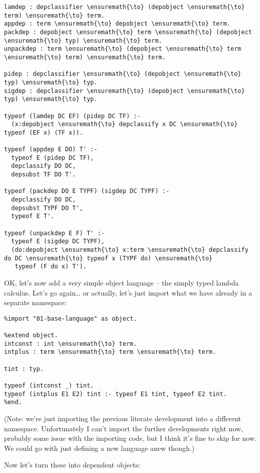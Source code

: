 \begin{verbatim}
lamdep : depclassifier \ensuremath{\to} (depobject \ensuremath{\to} term) \ensuremath{\to} term.
appdep : term \ensuremath{\to} depobject \ensuremath{\to} term.
packdep : depobject \ensuremath{\to} term \ensuremath{\to} (depobject \ensuremath{\to} typ) \ensuremath{\to} term.
unpackdep : term \ensuremath{\to} (depobject \ensuremath{\to} term \ensuremath{\to} term) \ensuremath{\to} term.

pidep : depclassifier \ensuremath{\to} (depobject \ensuremath{\to} typ) \ensuremath{\to} typ.
sigdep : depclassifier \ensuremath{\to} (depobject \ensuremath{\to} typ) \ensuremath{\to} typ.

typeof (lamdep DC EF) (pidep DC TF) :-
  (x:depobject \ensuremath{\to} depclassify x DC \ensuremath{\to} typeof (EF x) (TF x)).

typeof (appdep E DO) T' :-
  typeof E (pidep DC TF),
  depclassify DO DC,
  depsubst TF DO T'.

typeof (packdep DO E TYPF) (sigdep DC TYPF) :-
  depclassify DO DC,
  depsubst TYPF DO T',
  typeof E T'.

typeof (unpackdep E F) T' :-
  typeof E (sigdep DC TYPF),
  (do:depobject \ensuremath{\to} x:term \ensuremath{\to} depclassify do DC \ensuremath{\to} typeof x (TYPF do) \ensuremath{\to}
   typeof (F do x) T').
\end{verbatim}

OK, let's now add a very simple object language -- the simply typed
lambda calculus. Let's go again\ldots{} or actually, let's just import
what we have already in a separate namespace:

\begin{verbatim}
%import "01-base-language" as object.

%extend object.
intconst : int \ensuremath{\to} term.
intplus : term \ensuremath{\to} term \ensuremath{\to} term.

tint : typ.

typeof (intconst _) tint.
typeof (intplus E1 E2) tint :- typeof E1 tint, typeof E2 tint.
%end.
\end{verbatim}

(Note: we're just importing the previous literate development into a
different namespace. Unfortunately I can't import the further
developments right now, probably some issue with the importing code, but
I think it's fine to skip for now. We could go with just defining a new
language anew though.)

Now let's turn these into dependent objects:

